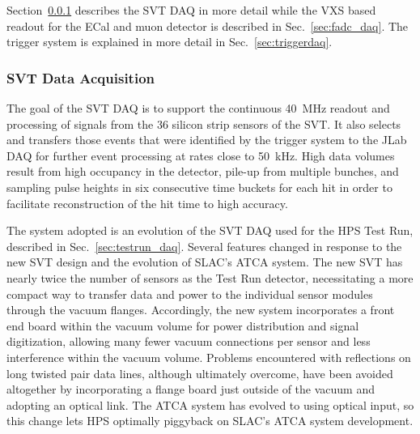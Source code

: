 Section~\ref{sec:svt_daq} describes the SVT DAQ in more detail while the VXS based readout for 
the ECal and muon detector is described in Sec.~\ref{sec:fadc_daq}. The trigger 
system is explained in more detail in Sec.~\ref{sec:triggerdaq}.

\subsubsection{SVT Data Acquisition}
\label{sec:svt_daq}
The goal of the SVT DAQ is to support the continuous 40~MHz readout and processing of signals from 
the 36 silicon strip sensors of the SVT. It also selects and transfers those events that were identified by the 
trigger system to the JLab DAQ for further event processing at rates 
close to 50~kHz. High data volumes result from high occupancy in the detector, pile-up from multiple bunches,
and sampling pulse heights in six consecutive time buckets for each hit in order to facilitate 
reconstruction of the hit time to high accuracy.

The system adopted is an evolution of the SVT DAQ used for the HPS Test Run, described in 
Sec.~\ref{sec:testrun_daq}. Several features changed in
response to the new SVT design and the evolution of SLAC's ATCA system. The new SVT has nearly twice 
the number of sensors as the Test Run detector, 
necessitating a more compact way to transfer data and power to the individual sensor modules through the
vacuum flanges. Accordingly, the new system incorporates a front end board within the vacuum volume for 
power distribution and signal digitization,
allowing many fewer vacuum connections per sensor and less interference within the vacuum volume. 
Problems encountered with reflections on long twisted pair
data lines, although ultimately overcome, have been avoided altogether by incorporating a flange board just 
outside of the vacuum and adopting an optical link. The ATCA system has evolved to using optical input, so 
this change lets HPS optimally piggyback on SLAC's ATCA system development.  

